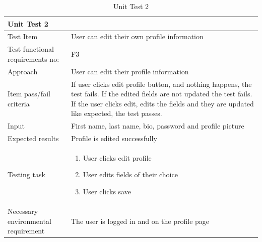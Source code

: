 \begin{table}[H]
\begin{tabular}{ | L{0.25\linewidth} | L{0.75\linewidth} | } 
 \hline {}
 Unit Test 2 & \\
 \hline
 Test Item & User can edit their own profile information\\ 
 \hline
 Test functional requirements no: & F3
 \\
 \hline
 Approach & User can edit their profile information\\ 
  \hline
 Item pass/fail criteria &  If user clicks edit profile button, and nothing happens, the test fails. If the edited fields are not updated the test fails. If the user clicks edit, edits the fields and they are updated like expected, the test passes.\\ 
 \hline
 Input &  First name, last name, bio, password and profile picture\\ 
 \hline
 Expected results & Profile is edited successfully \\ 
  \hline
Testing task & 
\vspace{-5mm}
    \begin{enumerate}[noitemsep]
  \item User clicks edit profile
  \item User edits fields of their choice
  \item User clicks save
   \end{enumerate}\\
 \hline
 Necessary environmental requirement & The user is logged in and on the profile page\\ 
 \hline
\end{tabular}
\caption{Unit Test 2}
\end{table}


